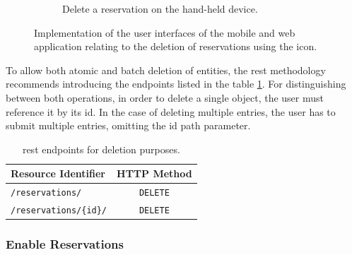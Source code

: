 \begin{figure}[h]
\begin{subfigure}[c]{0.3\textwidth}
         \caption{Delete a reservation on the hand-held device.}
         \label{fig:mobile-delete-reservation-impl}
    \end{subfigure}
    \caption{Implementation of the user interfaces of the mobile and web application relating to the deletion of reservations using the  icon.}
    \label{fig:impl-delete-reservation}
\end{figure}

\noindent To allow both atomic and batch deletion of entities, the \acrshort{rest} methodology recommends introducing the endpoints listed in the table \ref{tab:delete-reservation-rest}. 
For distinguishing between both operations, in order to delete a single object, the user must reference it by its \acrshort{id}. 
In the case of deleting multiple entries, the user has to submit multiple entries, omitting the \acrshort{id} path parameter.

\begingroup
\setlength{\tabcolsep}{10pt} %
\renewcommand{\arraystretch}{1.5} %
\begin{table}[h]
\centering
\caption{\acrshort{rest} endpoints for deletion purposes.}
    \begin{tabular}{l|c}
    Resource Identifier & HTTP Method \\ \hline
    \texttt{/reservations/} & \texttt{DELETE} \\
    \texttt{/reservations/\{id\}/} & \texttt{DELETE}
    \end{tabular}
\label{tab:delete-reservation-rest}
\end{table}
\endgroup

\newpage

\subsubsection{Enable Reservations}
\label{ch:Implementation:sec:Reservation System:ssec:Management Capabilities:sssec:Enable Reservations}

